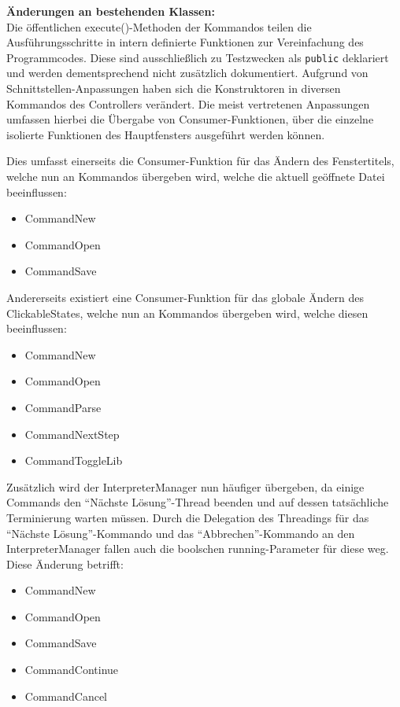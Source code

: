 \documentclass[parskip=full,11pt,twoside]{scrartcl}
\begin{document}
\textbf{Änderungen an bestehenden Klassen:}\\
Die öffentlichen execute()-Methoden der Kommandos teilen die Ausführungsschritte in intern definierte Funktionen zur Vereinfachung des Programmcodes. Diese sind ausschließlich zu Testzwecken als \texttt{public} deklariert und werden dementsprechend nicht zusätzlich dokumentiert. Aufgrund von Schnittstellen-Anpassungen haben sich die Konstruktoren in diversen Kommandos des Controllers verändert. Die meist vertretenen Anpassungen umfassen hierbei die Übergabe von Consumer-Funktionen, über die einzelne isolierte Funktionen des Hauptfensters ausgeführt werden können.

Dies umfasst einerseits die Consumer-Funktion für das Ändern des Fenstertitels, welche nun an Kommandos übergeben wird, welche die aktuell geöffnete Datei beeinflussen:
\begin{multicols}{3}
	\begin{itemize}
		\item CommandNew
		\item CommandOpen
		\item CommandSave
	\end{itemize}
\end{multicols}

Andererseits existiert eine Consumer-Funktion für das globale Ändern des ClickableStates, welche nun an Kommandos übergeben wird, welche diesen beeinflussen:
\begin{multicols}{3}
	\begin{itemize}
		\item CommandNew
		\item CommandOpen
		\item CommandParse
		\item CommandNextStep
		\item CommandToggleLib
	\end{itemize}
\end{multicols}

Zusätzlich wird der InterpreterManager nun häufiger übergeben, da einige Commands den \enquote{Nächste Lösung}-Thread beenden und auf dessen tatsächliche Terminierung warten müssen. Durch die Delegation des Threadings für das \enquote{Nächste Lösung}-Kommando und das \enquote{Abbrechen}-Kommando an den InterpreterManager fallen auch die boolschen running-Parameter für diese weg. Diese Änderung betrifft:
\begin{multicols}{3}
	\begin{itemize}
		\item CommandNew
		\item CommandOpen
		\item CommandSave
		\item CommandContinue
		\item CommandCancel
	\end{itemize}
\end{multicols}
\end{document}
